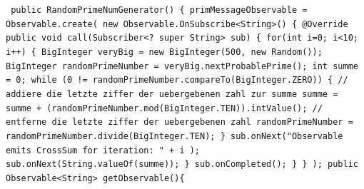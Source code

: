 \documentclass[12pt,oneside,a4paper,bibtotoc,liststotoc]{scrreprt}
\begin{document}
   \texttt{\newline
 public RandomPrimeNumGenerator()\newline
   \{\newline
   primMessageObservable = Observable.create(\newline
           new Observable.OnSubscribe<String>() \{\newline
               @Override\newline
               public void call(Subscriber<? super String> sub) \{\newline
               \newline
                   for(int i=0; i<10; i++)\newline
                   \{\newline
                       BigInteger veryBig = new BigInteger(500, new Random());\newline
                       BigInteger randomPrimeNumber = veryBig.nextProbablePrime();\newline
                       int summe = 0;\newline
                       while (0 != randomPrimeNumber.compareTo(BigInteger.ZERO)) \{\newline
                           // addiere die letzte ziffer der uebergebenen zahl zur summe\newline
                           summe = summe + (randomPrimeNumber.mod(BigInteger.TEN)).intValue();\newline
                           // entferne die letzte ziffer der uebergebenen zahl\newline
                           randomPrimeNumber = randomPrimeNumber.divide(BigInteger.TEN);\newline
                       \}\newline
\newline
                      sub.onNext("Observable emits CrossSum for iteration: " + i );\newline
                      sub.onNext(String.valueOf(summe));\newline
                  \}\newline
                   sub.onCompleted();\newline
              \}\newline
           \}\newline
   );\newline
\newline
  public Observable<String> getObservable()\{\newline
}
\end{document}
